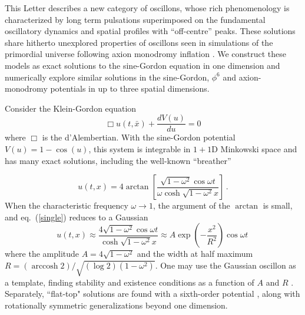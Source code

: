 \documentclass[%
reprint,
superscriptaddress,
amsmath,amssymb,
aps,
prl,
floatfix,
nofootinbib
]{revtex4-1}
\DeclareMathOperator{\arccosh}{arccosh}
\begin{document}
This Letter describes a new category of oscillons, whose  rich phenomenology is characterized by long term pulsations superimposed on the fundamental oscillatory dynamics and spatial profiles with  ``off-centre'' peaks. These solutions share  hitherto unexplored properties of oscillons seen in simulations of the primordial universe following axion monodromy inflation \cite{stringInflationBook,Silverstein:2008sg,McAllister:2008hb,Flauger:2009ab,Amin:2010dc, Amin:2011hj}. We  construct these models as exact solutions to the sine-Gordon equation in one dimension and   numerically explore similar solutions in the sine-Gordon, $\phi^6$ and axion-monodromy potentials in up to three spatial dimensions. 
 
 \medbreak{} Consider the Klein-Gordon equation
 \begin{equation}\label{kg}
 \Box u(t,\bar{x}) + \frac{ d V(u)}{du} = 0
 \end{equation}
where  $\Box$ is the d'Alembertian.  With the sine-Gordon potential $V(u) = 1-\cos(u)$,  this system is integrable in $1+1$D Minkowski space and has  many exact solutions,  including the well-known ``breather'' 

%
\begin{equation}\label{single}
  u(t,x) = 4 \arctan\left[ \frac{\sqrt{1-\omega^2} \cos \omega t}{\omega \cosh \sqrt{1-\omega^2} x} \right] \, .
\end{equation}
%
When the characteristic frequency $\omega\to1$, the argument of the $\arctan$ is small, and eq.~(\ref{single}) reduces to a Gaussian  
%
\begin{equation}
  u(t,x) \approx \frac{4\sqrt{1-\omega^2}\cos\omega t}{\cosh \sqrt{1-\omega^2} x} \approx A\exp\left(-\frac{x^2}{R^2}\right)\cos\omega t \,
\end{equation}
%
where the amplitude $A = 4\sqrt{1-\omega^2}$ and the width at half maximum $R=(\arccosh 2) /\sqrt{(\log 2)(1 - \omega^2)}$. One may use the Gaussian oscillon as a template, finding stability and existence conditions as a function of $A$ and $R$  \cite{Gleiser:2008ty}. Separately, ``flat-top" solutions are found with a sixth-order potential \cite{Amin:2010jq}, along with rotationally symmetric generalizations beyond one dimension. 
\end{document}

